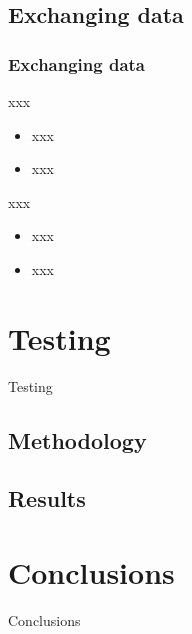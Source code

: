 \documentclass{beamer}
\begin{document}
\subsection{Exchanging data}

\begin{frame}	
	\frametitle{Exchanging data}
	
	\begin{block}{xxx}
		\begin{itemize}
			\item xxx
			\item xxx
		\end{itemize}
	\end{block}
	
	\begin{block}{xxx}
		\begin{itemize}
			\item xxx
			\item xxx
		\end{itemize}
	\end{block}
\end{frame}


\section{Testing}

\begin{frame}	
	\begin{Huge}
		\begin{center}
			Testing
		\end{center}
	\end{Huge}
\end{frame}

\subsection{Methodology}


\subsection{Results}

\section{Conclusions}

\begin{frame}	
	\begin{Huge}
		\begin{center}
			Conclusions
		\end{center}
	\end{Huge}
\end{frame}
\end{document}
